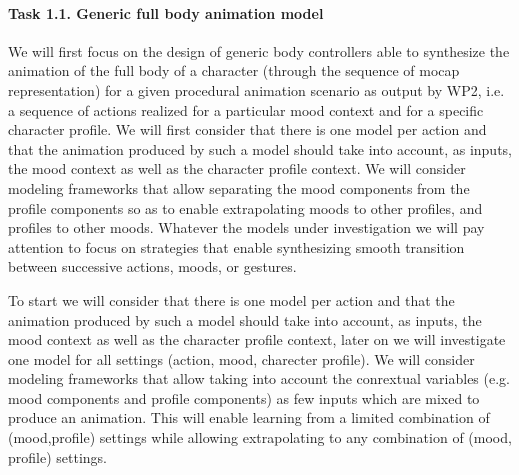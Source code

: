 

% 


\paragraph{Task 1.1. Generic full body animation model}

We will first focus on the design of generic body controllers able to synthesize the animation of the full body of a character (through the sequence of mocap representation) for a given procedural animation scenario as output by WP2, i.e. a sequence of actions realized for a particular mood context and for a specific character profile. We will first consider that there is one model per action and that the animation produced by such a model should take into account, as inputs, the mood context as well as the character profile context. 
We will consider modeling frameworks that allow separating the mood components from the profile components so as to enable extrapolating moods to other profiles, and profiles to other moods. Whatever the models under investigation we will pay attention to focus on strategies that enable synthesizing smooth transition between successive actions, moods, or gestures. 

To start we will consider that there is one model per action and that the animation produced by such a model should take into account, as inputs, the mood context as well as the character profile context, later on we will investigate one model for all settings (action, mood, charecter profile). We will consider modeling frameworks that allow taking into account the conrextual variables (e.g. mood components and profile components) as few inputs which are mixed to produce an animation. This will enable learning from a limited combination of (mood,profile) settings while allowing extrapolating to any combination of (mood, profile) settings. 

